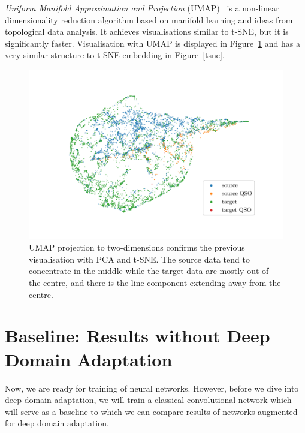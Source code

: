 \textit{Uniform Manifold Approximation and Projection} (UMAP)~\cite{mcinnes2018}
is a non-linear dimensionality reduction algorithm based on manifold learning and ideas from topological data analysis.
It achieves visualisations similar to t-SNE, but it is significantly faster.
Visualisation with UMAP is displayed in Figure~\ref{umap}
and has a very similar structure to t-SNE embedding in Figure~\ref{tsne}.

\begin{figure}
\includegraphics[width=\textwidth]{img/umap.pdf}
\caption[UMAP visualisation of source and target data distributions]{
	UMAP projection to two-dimensions confirms the previous visualisation
	with PCA and t-SNE.
	The source data tend to concentrate in the middle
	while the target data are mostly out of the centre,
	and there is the line component extending away from the centre.
	}
\label{umap}
\end{figure}

\section{Baseline: Results without Deep Domain Adaptation}
\label{baseline}

Now, we are ready for training of neural networks.
However, before we dive into deep domain adaptation,
we will train a classical convolutional network
which will serve as a baseline to which we can compare results of networks augmented for deep domain adaptation.

